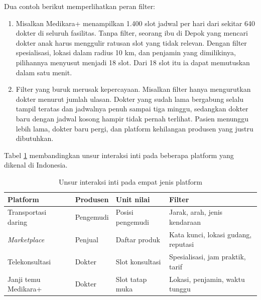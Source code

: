 Dua contoh berikut memperlihatkan peran filter:
\begin{enumerate}
  \item Misalkan Medikara+ menampilkan 1.400 slot jadwal per hari dari sekitar 640
        dokter di seluruh fasilitas. Tanpa filter, seorang ibu di Depok yang
        mencari dokter anak harus menggulir ratusan slot yang tidak relevan.
        Dengan filter spesialisasi, lokasi dalam radius 10 km, dan penjamin
        yang dimilikinya, pilihannya menyusut menjadi 18 slot. Dari 18 slot itu
        ia dapat memutuskan dalam satu menit.
  \item Filter yang buruk merusak kepercayaan. Misalkan filter hanya
        mengurutkan dokter menurut jumlah ulasan. Dokter yang sudah lama
        bergabung selalu tampil teratas dan jadwalnya penuh sampai tiga minggu,
        sedangkan dokter baru dengan jadwal kosong hampir tidak pernah
        terlihat. Pasien menunggu lebih lama, dokter baru pergi, dan platform
        kehilangan produsen yang justru dibutuhkan.
\end{enumerate}

Tabel \ref{tab:ch02-interaksi-inti} membandingkan unsur interaksi inti pada
beberapa platform yang dikenal di Indonesia.

\begin{table}[!htb]
  \centering
  \caption{Unsur interaksi inti pada empat jenis platform}
  \label{tab:ch02-interaksi-inti}
  \begin{tabularx}{\textwidth}{lllX}
    \hline
    \textbf{Platform} & \textbf{Produsen} & \textbf{Unit nilai} & \textbf{Filter} \\
    \hline
    Transportasi daring & Pengemudi & Posisi pengemudi & Jarak, arah, jenis kendaraan \\
    \hline
    \textit{Marketplace} & Penjual & Daftar produk & Kata kunci, lokasi gudang, reputasi \\
    \hline
    Telekonsultasi & Dokter & Slot konsultasi & Spesialisasi, jam praktik, tarif \\
    \hline
    Janji temu Medikara+ & Dokter & Slot tatap muka & Lokasi, penjamin, waktu tunggu \\
    \hline
  \end{tabularx}
\end{table}

